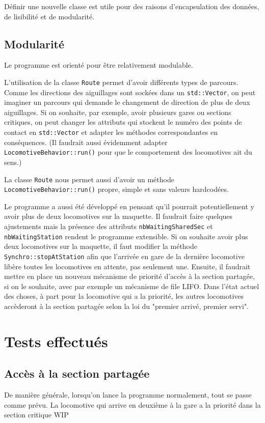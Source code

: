 \documentclass{article}
\begin{document}
Définir une nouvelle classe est utile pour des raisons d'encapsulation des données, de lisibilité et de modularité.

\subsection*{Modularité}
Le programme est orienté pour être relativement modulable.

L'utilisation de la classe \texttt{Route} permet d'avoir différents types de parcours. Comme les directions des aiguillages
sont sockées dans un \texttt{std::Vector}, on peut imaginer un parcours qui demande le changement de direction de plus de 
deux aiguillages. Si on souhaite, par exemple, avoir plusieurs gares ou sections critiques, on peut changer les attributs qui stockent
le numéro des points de contact en \texttt{std::Vector} et adapter les méthodes correspondantes en conséquences. (Il faudrait aussi 
évidemment adapter \texttt{LocomotiveBehavior::run()} pour que le comportement des locomotives ait du sens.)

La classe \texttt{Route} nous permet aussi d'avoir un méthode \texttt{LocomotiveBehavior::run()} propre, simple et sans valeurs 
hardcodées.

Le programme a aussi été développé en pensant qu'il pourrait potentiellement y avoir plus de deux locomotives sur la maquette. Il faudrait
faire quelques ajustements mais la présence des attributs \texttt{nbWaitingSharedSec} et \texttt{nbWaitingStation} rendent le programme
extensible. Si on souhaite avoir plus deux locomotives sur la  maquette, il faut modifier la méthode \texttt{Synchro::stopAtStation} afin
que l'arrivée en gare de la dernière locomotive libère toutes les locomotives en attente, pas seulement une. Ensuite, il faudrait 
mettre en place un nouveau mécanisme de priorité d'accès à la section partagée, si on le souhaite, avec par exemple un mécanisme de file
LIFO. Dans l'état actuel des choses, à part pour la locomotive qui a la priorité, les autres locomotives accèderont à la section partagée 
selon la loi du "premier arrivé, premier servi". 

\section*{Tests effectués}
\subsection*{Accès à la section partagée}
De manière générale, lorsqu'on lance la programme normalement, tout se passe comme prévu. La locomotive qui arrive en deuxième à la gare a
la priorité dans la section critique WIP
\end{document}
